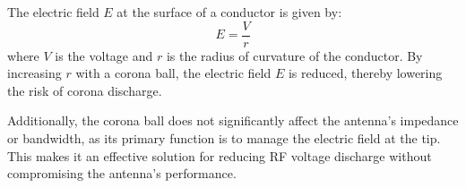 The electric field \( E \) at the surface of a conductor is given by:
\[
E = \frac{V}{r}
\]
where \( V \) is the voltage and \( r \) is the radius of curvature of the conductor. By increasing \( r \) with a corona ball, the electric field \( E \) is reduced, thereby lowering the risk of corona discharge.

Additionally, the corona ball does not significantly affect the antenna's impedance or bandwidth, as its primary function is to manage the electric field at the tip. This makes it an effective solution for reducing RF voltage discharge without compromising the antenna's performance.

